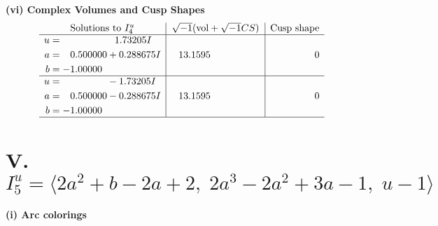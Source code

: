 \documentclass[1p]{elsarticle_modified}
\theoremstyle{definition}
\newcommand{\I}{\sqrt{-1}}
\begin{document}
\newpage\flushleft \textbf{(vi) Complex Volumes and Cusp Shapes}
$$\begin{array}{c|c|c}  
\text{Solutions to }I^u_{4}& \I (\text{vol} + \sqrt{-1}CS) & \text{Cusp shape}\\
 \hline 
\begin{aligned}
u &= \phantom{-0.000000 -}1.73205 I \\
a &= \phantom{-}0.500000 + 0.288675 I \\
b &= -1.00000\phantom{ +0.000000I}\end{aligned}
 & \phantom{-}13.1595\phantom{ +0.000000I} & \phantom{-0.000000 } 0 \\ \hline\begin{aligned}
u &= \phantom{-0.000000 } -1.73205 I \\
a &= \phantom{-}0.500000 - 0.288675 I \\
b &= -1.00000\phantom{ +0.000000I}\end{aligned}
 & \phantom{-}13.1595\phantom{ +0.000000I} & \phantom{-0.000000 } 0\\
 \hline 
 \end{array}$$\newpage\newpage\renewcommand{\arraystretch}{1}
\centering \section*{V. $I^u_{5}= \langle 2 a^2+b-2 a+2,\;2 a^3-2 a^2+3 a-1,\;u-1 \rangle$}
\flushleft \textbf{(i) Arc colorings}\\
\end{document}
